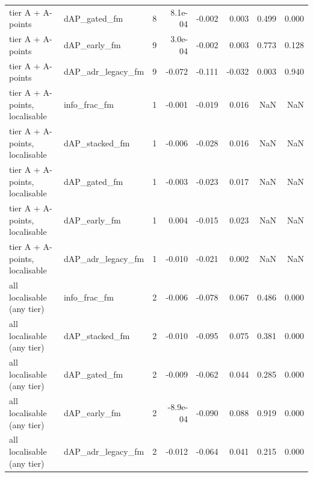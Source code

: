 \begin{tabular}{llrrrrrr}
tier A + A-points & dAP\_gated\_fm & 8 & 8.1e-04 & -0.002 & 0.003 & 0.499 & 0.000 \\
tier A + A-points & dAP\_early\_fm & 9 & 3.0e-04 & -0.002 & 0.003 & 0.773 & 0.128 \\
tier A + A-points & dAP\_adr\_legacy\_fm & 9 & -0.072 & -0.111 & -0.032 & 0.003 & 0.940 \\
tier A + A-points, localisable & info\_frac\_fm & 1 & -0.001 & -0.019 & 0.016 & NaN & NaN \\
tier A + A-points, localisable & dAP\_stacked\_fm & 1 & -0.006 & -0.028 & 0.016 & NaN & NaN \\
tier A + A-points, localisable & dAP\_gated\_fm & 1 & -0.003 & -0.023 & 0.017 & NaN & NaN \\
tier A + A-points, localisable & dAP\_early\_fm & 1 & 0.004 & -0.015 & 0.023 & NaN & NaN \\
tier A + A-points, localisable & dAP\_adr\_legacy\_fm & 1 & -0.010 & -0.021 & 0.002 & NaN & NaN \\
all localisable (any tier) & info\_frac\_fm & 2 & -0.006 & -0.078 & 0.067 & 0.486 & 0.000 \\
all localisable (any tier) & dAP\_stacked\_fm & 2 & -0.010 & -0.095 & 0.075 & 0.381 & 0.000 \\
all localisable (any tier) & dAP\_gated\_fm & 2 & -0.009 & -0.062 & 0.044 & 0.285 & 0.000 \\
all localisable (any tier) & dAP\_early\_fm & 2 & -8.9e-04 & -0.090 & 0.088 & 0.919 & 0.000 \\
all localisable (any tier) & dAP\_adr\_legacy\_fm & 2 & -0.012 & -0.064 & 0.041 & 0.215 & 0.000 \\
\bottomrule
\end{tabular}
